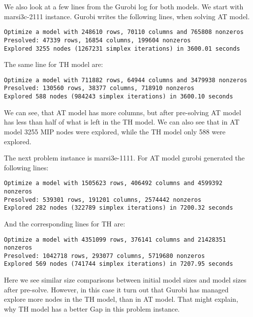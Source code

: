 We also look at a few lines from the Gurobi log for both models.
We start with marsi3c-2111 instance. Gurobi writes the following lines, when
solving AT model.
\begin{verbatim}
Optimize a model with 248610 rows, 70110 columns and 765808 nonzeros
Presolved: 47339 rows, 16854 columns, 199604 nonzeros
Explored 3255 nodes (1267231 simplex iterations) in 3600.01 seconds
\end{verbatim}
The same line for TH model are:
\begin{verbatim}
Optimize a model with 711882 rows, 64944 columns and 3479938 nonzeros
Presolved: 130560 rows, 38377 columns, 718910 nonzeros
Explored 588 nodes (984243 simplex iterations) in 3600.10 seconds
\end{verbatim}
We can see, that AT model has more columns, but after pre-solving AT model has
less than half of what is left in the TH model. We can also see that in AT
model 3255 MIP nodes were explored, while the TH model only 588 were explored.

The next problem instance is marsi3e-1111. For AT model gurobi generated the
following lines:
\begin{verbatim}
Optimize a model with 1505623 rows, 406492 columns and 4599392 nonzeros
Presolved: 539301 rows, 191201 columns, 2574442 nonzeros
Explored 282 nodes (322789 simplex iterations) in 7200.32 seconds
\end{verbatim}
And the corresponding lines for TH are:
\begin{verbatim}
Optimize a model with 4351099 rows, 376141 columns and 21428351 nonzeros
Presolved: 1042718 rows, 293077 columns, 5719680 nonzeros
Explored 569 nodes (741744 simplex iterations) in 7207.95 seconds
\end{verbatim}
Here we see similar size comparisons between initial model sizes and model
sizes after pre-solve. However, in this case it turn out that Gurobi has
managed explore more nodes in the TH model, than in AT model. That might
explain, why TH model has a better Gap in this problem instance.

